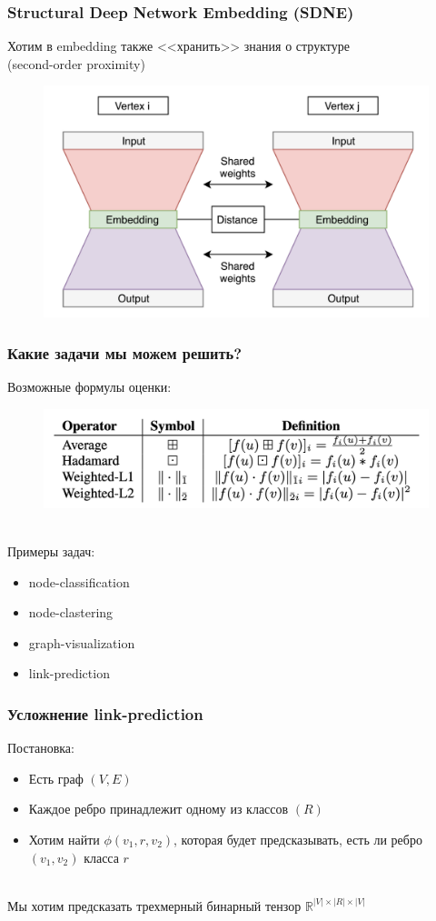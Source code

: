 \documentclass{beamer}
\newcommand{\R}{\mathbb{R}}
\newcommand{\skipline}[0]{$ $\\}
\begin{document}
\begin{frame}
    \frametitle{Structural Deep Network Embedding (SDNE)}
    Хотим в embedding также <<хранить>> знания о структуре\\ (second-order proximity)
    \begin{figure}
        \includegraphics[width=0.75\columnwidth]{SDNE.png}
    \end{figure}
\end{frame}

\begin{frame}
    \frametitle{Какие задачи мы можем решить?}
    Возможные формулы оценки:
    \begin{figure}
        \includegraphics[width=0.75\columnwidth]{operators.png}
    \end{figure}
    \skipline
    Примеры задач:
    \begin{itemize}
        \item node-classification
        \item node-clastering
        \item graph-visualization
        \item link-prediction 
    \end{itemize}
\end{frame}

\begin{frame}
    \frametitle{Усложнение link-prediction}
    Постановка:
    \begin{itemize}
        \item Есть граф $\left(V, E\right)$
        \item Каждое ребро принадлежит одному из классов $(R)$
        \item Хотим найти $\phi(v_1, r, v_2)$, которая будет предсказывать, есть ли ребро $(v_1, v_2)$ класса $r$
    \end{itemize}
    \skipline
    Мы хотим предсказать трехмерный бинарный тензор $\R^{|V| \times |R| \times |V|}$
\end{frame}
\end{document}
